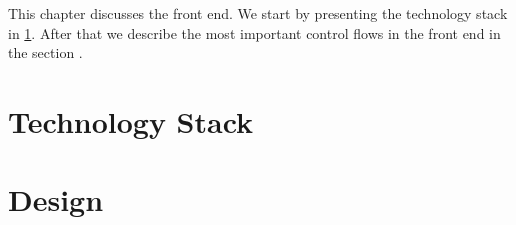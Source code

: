 This chapter discusses the front end. We start by presenting the technology stack in \cref{sec:1:technologyStack}. After that we describe the most important control flows in the front end in the section .

\section{Technology Stack}
\label{sec:1:technologyStack}
	

\section{Design}
\label{sec:1:design}
	